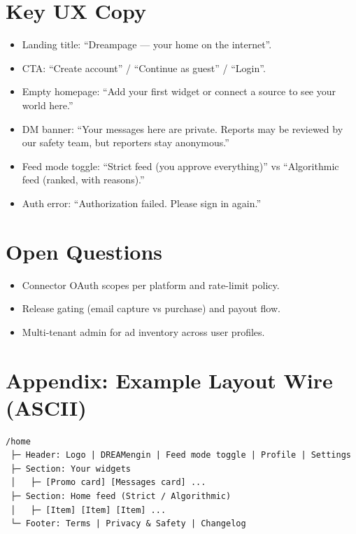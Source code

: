 \documentclass[11pt]{article}
\begin{document}
\section{Key UX Copy}
\begin{itemize}
  \item Landing title: ``Dreampage --- your home on the internet''.
  \item CTA: ``Create account'' / ``Continue as guest'' / ``Login''.
  \item Empty homepage: ``Add your first widget or connect a source to see your world here.''
  \item DM banner: ``Your messages here are private. Reports may be reviewed by our safety team, but reporters stay anonymous.''
  \item Feed mode toggle: ``Strict feed (you approve everything)'' vs ``Algorithmic feed (ranked, with reasons).''
  \item Auth error: ``Authorization failed. Please sign in again.''
\end{itemize}

\section{Open Questions}
\begin{itemize}
  \item Connector OAuth scopes per platform and rate-limit policy.
  \item Release gating (email capture vs purchase) and payout flow.
  \item Multi-tenant admin for ad inventory across user profiles.
\end{itemize}

\section{Appendix: Example Layout Wire (ASCII)}
\begin{verbatim}
/home
 ├─ Header: Logo | DREAMengin | Feed mode toggle | Profile | Settings
 ├─ Section: Your widgets
 │   ├─ [Promo card] [Messages card] ...
 ├─ Section: Home feed (Strict / Algorithmic)
 │   ├─ [Item] [Item] [Item] ...
 └─ Footer: Terms | Privacy & Safety | Changelog
\end{verbatim}
\end{document}
